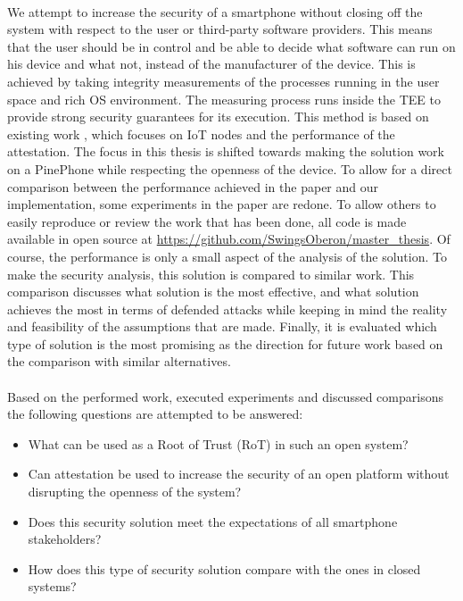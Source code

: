 \paragraph*{}
We attempt to increase the security of a smartphone without closing off the system with respect to the user or third-party software providers. This means that the user should be in control and be able to decide what software can run on his device and what not, instead of the manufacturer of the device. This is achieved by taking integrity measurements of the processes running in the user space and rich OS environment. The measuring process runs inside the TEE to provide strong security guarantees for its execution. This method is based on existing work \cite{LingZhen2021Sbtb}, which focuses on IoT nodes and the performance of the attestation. The focus in this thesis is shifted towards making the solution work on a PinePhone while respecting the openness of the device. To allow for a direct comparison between the performance achieved in the paper and our implementation, some experiments in the paper are redone. To allow others to easily reproduce or review the work that has been done, all code is made available in open source at \url{https://github.com/SwingsOberon/master_thesis}. Of course, the performance is only a small aspect of the analysis of the solution. To make the security analysis, this solution is compared to similar work. This comparison discusses what solution is the most effective, and what solution achieves the most in terms of defended attacks while keeping in mind the reality and feasibility of the assumptions that are made. Finally, it is evaluated which type of solution is the most promising as the direction for future work based on the comparison with similar alternatives.

\paragraph*{}
Based on the performed work, executed experiments and discussed comparisons the following questions are attempted to be answered: \begin{itemize}
\item What can be used as a Root of Trust (RoT) in such an open system?
\item Can attestation be used to increase the security of an open platform without disrupting the openness of the system?
\item Does this security solution meet the expectations of all smartphone stakeholders?
\item How does this type of security solution compare with the ones in closed systems?
\end{itemize}

